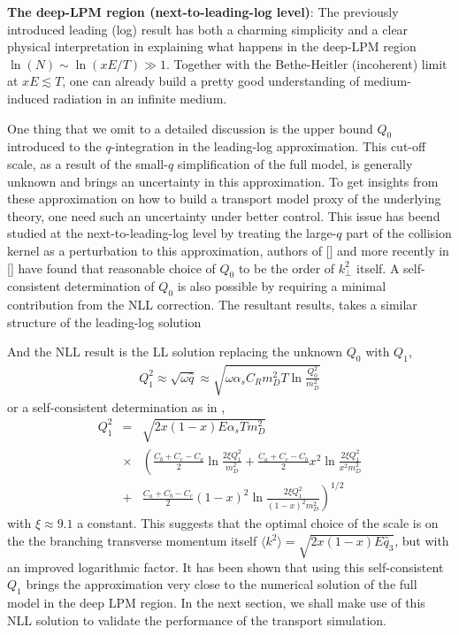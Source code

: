 {\bf The deep-LPM region (next-to-leading-log level)}:
The previously introduced leading (log) result has both a charming simplicity and a clear physical interpretation in explaining what happens in the deep-LPM region $\ln(N) \sim \ln(xE/T) \gg 1$.
Together with the Bethe-Heitler (incoherent) limit at $xE \lesssim T$, one can already build a pretty good understanding of medium-induced radiation in an infinite medium.

One thing that we omit to a detailed discussion is the upper bound $Q_0$ introduced to the $q$-integration in the leading-log approximation.
This cut-off scale, as a result of the small-$q$ simplification of the full model, is generally unknown and brings an uncertainty in this approximation. 
To get insights from these approximation on how to build a transport model proxy of the underlying theory, one need such an uncertainty under better control.
This issue has beend studied at the next-to-leading-log level by treating the large-$q$ part of the collision kernel as a perturbation to this approximation, authors of [] and more recently in [] have found that reasonable choice of $Q_0$ to be the order of $k_\perp^2$ itself.
A self-consistent determination of $Q_0$ is also possible by requiring a minimal contribution from the NLL correction.
The resultant results, takes a similar structure of the leading-log solution

And the NLL result is the LL solution replacing the unknown $Q_0$ with $Q_{1}$,
\begin{eqnarray}
Q_1^2  \approx \sqrt{\omega \hat{q}} \approx \sqrt{\omega \alpha_s C_R m_D^2 T \ln\frac{Q_0^2}{m_D^2}}
\label{eq:Q1}
\end{eqnarray}
or a self-consistent determination as in \cite{Arnold:2008zu},
\begin{eqnarray}
Q_1^2 &=& \sqrt{2 x (1-x) E \alpha_s T m_D^2}\\\nonumber
&\times & \left(
\frac{C_b+C_c-C_a}{2}\ln\frac{2\xi Q_1^2}{m_D^2} + \frac{C_a+C_c-C_b}{2} x^2 \ln\frac{2\xi Q_1^2}{x^2 m_D^2} \right.\\\nonumber 
&+& \left.\frac{C_a+C_b-C_c}{2} (1-x)^2 \ln\frac{2\xi Q_1^2}{(1-x)^2 m_D^2} \right)^{1/2}
\label{eq:Q1-sf}
\end{eqnarray}
with $\xi \approx 9.1$ a constant. 
This suggests that the optimal choice of the scale is on the the branching transverse momentum itself $\langle k^2 \rangle = \sqrt{2x(1-x)E\hat{q}_3}$, but with an improved logarithmic factor.
It has been shown that using this self-consistent $Q_1$ brings the approximation very close to the numerical solution of the full model in the deep LPM region.
In the next section, we shall make use of this NLL solution to validate the performance of the transport simulation.

